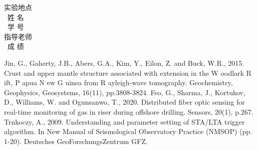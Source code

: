 \documentclass{ctexart}
\begin{document}
\begin{titlepage}
    \begin{center}
    \Large
            实验地点\ \ \underline{}\\
            \vspace{0.3cm}
            \quad\ 姓\; 名 \ \ \underline{}\\
            \vspace{0.3cm}
            \quad\ 学\; 号\ \ \underline{\makebox[220pt]{}}\\
            \vspace{0.3cm}
            指导老师\ \ \underline{\makebox[220pt]{}}\\
            \vspace{0.3cm}
            \quad\ 成\; 绩\ \ \underline{\makebox[220pt]{}}\\
         
    \end{center}
        
    
\end{titlepage}

\newpage
\tableofcontents
\thispagestyle{empty}%
\thispagestyle{empty}%

\newpage
{}%

\begin{thebibliography}{99} 
        Jin, G., Gaherty, J.B., Abers, G.A., Kim, Y., Eilon, Z. and Buck, W.R., 2015. Crust and upper mantle structure associated with extension in the W oodlark R ift, P apua N ew G uinea from R ayleigh‐wave tomography. Geochemistry, Geophysics, Geosystems, 16(11), pp.3808-3824.
        Feo, G., Sharma, J., Kortukov, D., Williams, W. and Ogunsanwo, T., 2020. Distributed fiber optic sensing for real-time monitoring of gas in riser during offshore drilling. Sensors, 20(1), p.267.
        Trnkoczy, A., 2009. Understanding and parameter setting of STA/LTA trigger algorithm. In New Manual of Seismological Observatory Practice (NMSOP) (pp. 1-20). Deutsches GeoForschungsZentrum GFZ.
\end{thebibliography}
\end{document}
